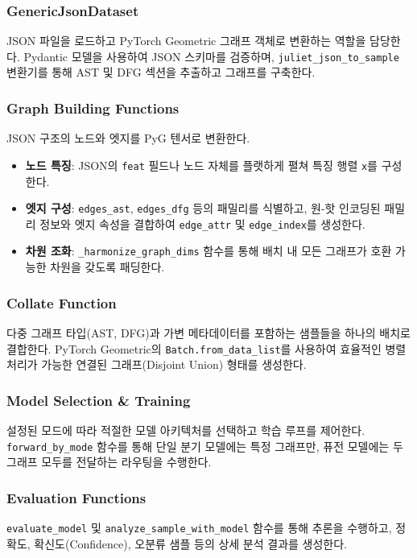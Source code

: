 \subsubsection{GenericJsonDataset}
JSON 파일을 로드하고 PyTorch Geometric 그래프 객체로 변환하는 역할을 담당한다. Pydantic 모델을 사용하여 JSON 스키마를 검증하며, \texttt{juliet\_json\_to\_sample} 변환기를 통해 AST 및 DFG 섹션을 추출하고 그래프를 구축한다.

\subsubsection{Graph Building Functions}
JSON 구조의 노드와 엣지를 PyG 텐서로 변환한다.
\begin{itemize}
    \item \textbf{노드 특징}: JSON의 \texttt{feat} 필드나 노드 자체를 플랫하게 펼쳐 특징 행렬 \texttt{x}를 구성한다.
    \item \textbf{엣지 구성}: \texttt{edges\_ast}, \texttt{edges\_dfg} 등의 패밀리를 식별하고, 원-핫 인코딩된 패밀리 정보와 엣지 속성을 결합하여 \texttt{edge\_attr} 및 \texttt{edge\_index}를 생성한다.
    \item \textbf{차원 조화}: \texttt{\_harmonize\_graph\_dims} 함수를 통해 배치 내 모든 그래프가 호환 가능한 차원을 갖도록 패딩한다.
\end{itemize}



\subsubsection{Collate Function}
다중 그래프 타입(AST, DFG)과 가변 메타데이터를 포함하는 샘플들을 하나의 배치로 결합한다. PyTorch Geometric의 \texttt{Batch.from\_data\_list}를 사용하여 효율적인 병렬 처리가 가능한 연결된 그래프(Disjoint Union) 형태를 생성한다.

\subsubsection{Model Selection \& Training}
설정된 모드에 따라 적절한 모델 아키텍처를 선택하고 학습 루프를 제어한다. \texttt{forward\_by\_mode} 함수를 통해 단일 분기 모델에는 특정 그래프만, 퓨전 모델에는 두 그래프 모두를 전달하는 라우팅을 수행한다.

\subsubsection{Evaluation Functions}
\texttt{evaluate\_model} 및 \texttt{analyze\_sample\_with\_model} 함수를 통해 추론을 수행하고, 정확도, 확신도(Confidence), 오분류 샘플 등의 상세 분석 결과를 생성한다.


